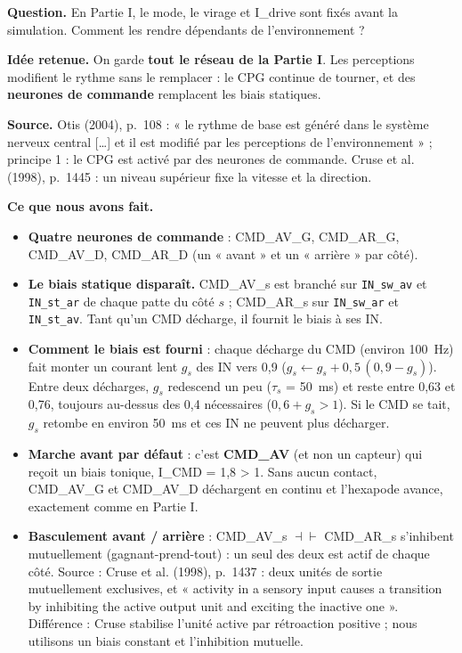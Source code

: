 \documentclass[11pt]{article}
\newcommand{\champ}[2]{\par\noindent\textbf{\color{bleu}#1} #2\par}
\newcommand{\code}[1]{\texttt{#1}}
\begin{document}
\champ{Question.}{En Partie I, le mode, le virage et I\_drive sont fixés avant la simulation.
Comment les rendre dépendants de l'environnement ?}
\champ{Idée retenue.}{On garde \textbf{tout le réseau de la Partie I}. Les perceptions modifient le
rythme sans le remplacer : le CPG continue de tourner, et des \textbf{neurones de commande}
remplacent les biais statiques.}
\champ{Source.}{Otis (2004), p.~108 \cite{otis2004} : « le rythme de base est généré dans le système
nerveux central […] et il est modifié par les perceptions de l'environnement » ; principe 1 :
le CPG est activé par des neurones de commande. Cruse et al. (1998), p.~1445 \cite{cruse1998} : un
niveau supérieur fixe la vitesse et la direction.}
\champ{Ce que nous avons fait.}{}
\begin{itemize}
  \item \textbf{Quatre neurones de commande} : CMD\_AV\_G, CMD\_AR\_G, CMD\_AV\_D, CMD\_AR\_D
        (un « avant » et un « arrière » par côté).
  \item \textbf{Le biais statique disparaît.} CMD\_AV\_s est branché sur \code{IN\_sw\_av} et
        \code{IN\_st\_ar} de chaque patte du côté $s$ ; CMD\_AR\_s sur \code{IN\_sw\_ar} et
        \code{IN\_st\_av}. Tant qu'un CMD décharge, il fournit le biais à ses IN.
  \item \textbf{Comment le biais est fourni} : chaque décharge du CMD (environ 100~Hz) fait monter
        un courant lent $g_s$ des IN vers 0,9 ($g_s \leftarrow g_s + 0{,}5\,(0{,}9 - g_s)$). Entre
        deux décharges, $g_s$ redescend un peu ($\tau_s$ = 50~ms) et reste entre 0,63 et 0,76,
        toujours au-dessus des 0,4 nécessaires ($0{,}6 + g_s > 1$). Si le CMD se tait, $g_s$
        retombe en environ 50~ms et ces IN ne peuvent plus décharger.
  \item \textbf{Marche avant par défaut} : c'est \textbf{CMD\_AV} (et non un capteur) qui reçoit
        un biais tonique, I\_CMD = 1,8 > 1. Sans aucun contact, CMD\_AV\_G et CMD\_AV\_D déchargent
        en continu et l'hexapode avance, exactement comme en Partie I.
  \item \textbf{Basculement avant / arrière} : CMD\_AV\_s $\dashv\vdash$ CMD\_AR\_s s'inhibent
        mutuellement (gagnant-prend-tout) : un seul des deux est actif de chaque côté.
        Source : Cruse et al. (1998), p.~1437 \cite{cruse1998} : deux unités de sortie
        mutuellement exclusives, et « activity in a sensory input causes a transition by
        inhibiting the active output unit and exciting the inactive one ». Différence : Cruse
        stabilise l'unité active par rétroaction positive ; nous utilisons un biais constant et
        l'inhibition mutuelle.
\end{itemize}
\end{document}
